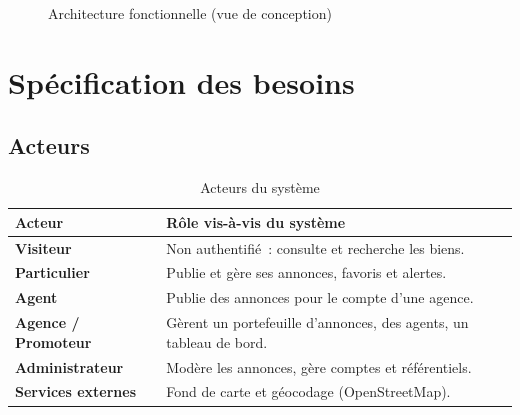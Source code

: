 \begin{figure}[H]
  \centering
  \caption{Architecture fonctionnelle (vue de conception)}
  \label{fig:archi-fonctionnelle}
\end{figure}

\section{Spécification des besoins}
\label{sec:specification}

\subsection{Acteurs}

\begin{table}[H]
\centering
\renewcommand{\arraystretch}{1.25}
\begin{tabularx}{\linewidth}{>{\bfseries}p{3cm} X}
\toprule
Acteur & Rôle vis-à-vis du système \\
\midrule
Visiteur       & Non authentifié~: consulte et recherche les biens. \\
Particulier    & Publie et gère ses annonces, favoris et alertes. \\
Agent          & Publie des annonces pour le compte d'une agence. \\
Agence / Promoteur & Gèrent un portefeuille d'annonces, des agents, un tableau de bord. \\
Administrateur & Modère les annonces, gère comptes et référentiels. \\
Services externes & Fond de carte et géocodage (OpenStreetMap). \\
\bottomrule
\end{tabularx}
\caption{Acteurs du système}
\label{tab:acteurs}
\end{table}

